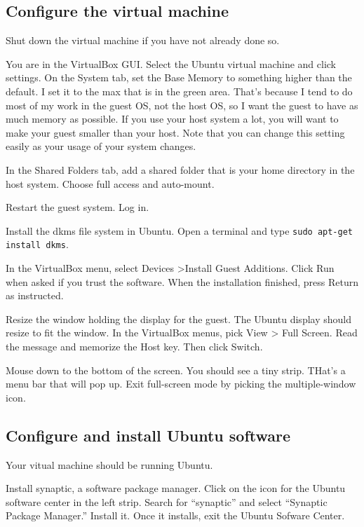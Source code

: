 \documentclass{article}
\let\code\texttt %
\begin{document}
\subsection{Configure the virtual machine}

Shut down the virtual machine if you have not already done so.

You are in the VirtualBox GUI. Select the Ubuntu virtual machine and click settings.
On the System tab, set the Base Memory to something higher than the default. I set it to the 
max that is in the green area. That's because I tend to do most of my
work in the guest OS, not the host OS, so I want the guest to have as
much memory as possible. If you use your host system a lot, you will
want to make your guest smaller than your host. Note that you can change
this setting easily as your usage of your system changes.

In the Shared Folders tab, add a shared folder that is your home
directory in the host system. Choose full access and auto-mount.

Restart the guest system. Log in.

Install the dkms file system in Ubuntu. Open a terminal and type
\code{sudo apt-get install dkms}.

In the VirtualBox menu, select Devices \textgreater Install Guest
Additions. Click Run when asked if you trust the software. When the
installation finished, press Return as instructed.

Resize the window holding the display for the guest. The Ubuntu display
should resize to fit the window. In the VirtualBox menus, pick View > Full Screen.
Read the message and memorize the Host key. Then click Switch.

Mouse down to the bottom of the screen. You should see a tiny strip.
THat's a menu bar that will pop up. Exit full-screen mode by picking the
multiple-window icon.

\subsection{Configure and install Ubuntu software}

Your vitual machine should be running Ubuntu.

Install synaptic, a software package manager. Click on the icon for the
Ubuntu software center in the left strip. Search for ``synaptic'' and
select ``Synaptic Package Manager.'' Install it. Once it installs, exit
the Ubuntu Sofware Center.
\end{document}
